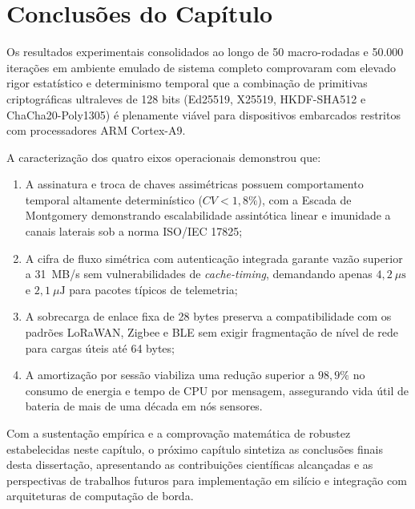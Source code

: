 \section{Conclusões do Capítulo}
\label{sec:conclusoes_capitulo}

Os resultados experimentais consolidados ao longo de 50 macro-rodadas e 50.000 iterações em ambiente emulado de sistema completo comprovaram com elevado rigor estatístico e determinismo temporal que a combinação de primitivas criptográficas ultraleves de 128 bits (Ed25519, X25519, HKDF-SHA512 e ChaCha20-Poly1305) é plenamente viável para dispositivos embarcados restritos com processadores ARM Cortex-A9.

A caracterização dos quatro eixos operacionais demonstrou que:
\begin{enumerate}
    \item A assinatura e troca de chaves assimétricas possuem comportamento temporal altamente determinístico ($CV < 1{,}8\%$), com a Escada de Montgomery demonstrando escalabilidade assintótica linear e imunidade a canais laterais sob a norma ISO/IEC 17825;
    \item A cifra de fluxo simétrica com autenticação integrada garante vazão superior a 31~MB/s sem vulnerabilidades de \textit{cache-timing}, demandando apenas $4{,}2~\mu\text{s}$ e $2{,}1~\mu\text{J}$ para pacotes típicos de telemetria;
    \item A sobrecarga de enlace fixa de 28 bytes preserva a compatibilidade com os padrões LoRaWAN, Zigbee e BLE sem exigir fragmentação de nível de rede para cargas úteis até 64 bytes;
    \item A amortização por sessão viabiliza uma redução superior a $98{,}9\%$ no consumo de energia e tempo de CPU por mensagem, assegurando vida útil de bateria de mais de uma década em nós sensores.
\end{enumerate}

Com a sustentação empírica e a comprovação matemática de robustez estabelecidas neste capítulo, o próximo capítulo sintetiza as conclusões finais desta dissertação, apresentando as contribuições científicas alcançadas e as perspectivas de trabalhos futuros para implementação em silício e integração com arquiteturas de computação de borda.
